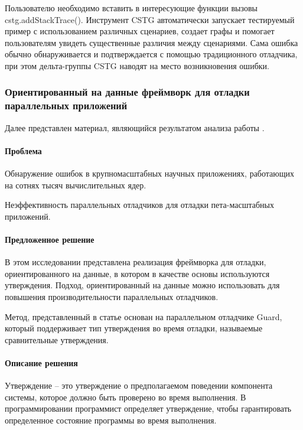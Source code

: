 Пользователю необходимо вставить в интересующие функции вызовы cstg.addStackTrace(). Инструмент CSTG автоматически запускает тестируемый пример с использованием различных сценариев, создает графы и помогает пользователям увидеть существенные различия между сценариями. Сама ошибка обычно обнаруживается и подтверждается с помощью традиционного отладчика, при этом дельта-группы CSTG наводят на место возникновения ошибки.

\subsubsection{Ориентированный на данные фреймворк для отладки параллельных приложений}

Далее представлен материал, являющийся результатом анализа работы \cite{Dinh2013}.

\paragraph{Проблема}

Обнаружение ошибок в крупномасштабных научных приложениях, работающих на сотнях тысяч вычислительных ядер.

Неэффективность параллельных отладчиков для отладки пета-масштабных приложений.

\paragraph{Предложенное решение}

В этом исследовании представлена реализация фреймворка для отладки, ориентированного на данные, в котором в качестве основы используются утверждения. Подход, ориентированный на данные можно использовать для повышения производительности параллельных отладчиков. 

Метод, представленный в статье основан на параллельном отладчике Guard, который поддерживает тип утверждения во время отладки, называемые сравнительные утверждения. 

\paragraph{Описание решения}

Утверждение -- это утверждение о предполагаемом поведении компонента системы, которое должно быть проверено во время выполнения. В программировании программист определяет утверждение, чтобы гарантировать определенное состояние программы во время выполнения.

